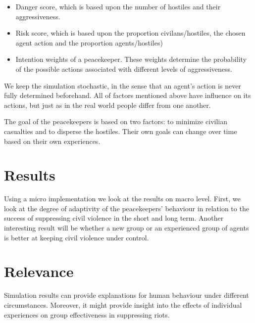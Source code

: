 \documentclass[11pt,a4paper]{article}
\begin{document}
		\begin{itemize}
			\item Danger score, which is based upon the number of hostiles and their aggressiveness.
			\item Risk score, which is based upon the proportion civilans/hostiles, the chosen agent action and the proportion agents/hostiles)
			\item Intention weights of a peacekeeper. These weights determine the probability of the possible actions associated with different levels of aggressiveness.
		\end{itemize}
		
		We keep the simulation stochastic, in the sense that an agent's action is never fully determined beforehand. All of factors mentioned above have influence on its actions, but just as in the real world people differ from one another.
	
		The goal of the peacekeepers is based on two factors: to minimize civilian casualties and to disperse the hostiles. Their own goals can change over time based on their own experiences. 
		
	\section{Results}
		Using a micro implementation we look at the results on macro level.
		First, we look at the degree of adaptivity of the peacekeepers' behaviour in relation to the success of suppressing civil violence in the short and long term. 
		Another interesting result will be whether a new group or an experienced group of agents is better at keeping civil violence under control.
		
	\section{Relevance}
		Simulation results can provide explanations for human behaviour under different circumstances. Moreover, it might provide insight into the effects of individual experiences on group effectiveness in suppressing riots.
		
	
	
\end{document}
